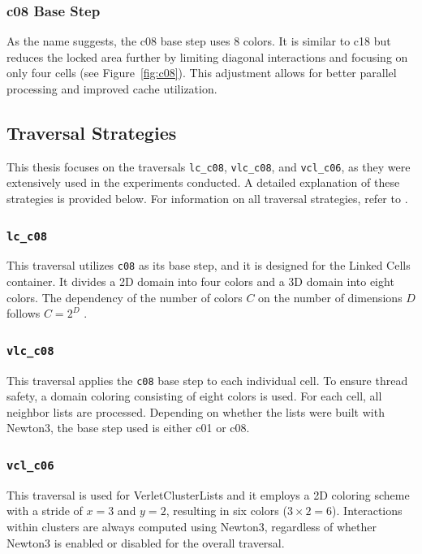 \subsubsection{c08 Base Step} As the name suggests, the c08 base step uses 8 colors. It is similar to c18 but reduces the locked area further by limiting diagonal interactions and focusing on only four cells (see Figure~\ref{fig:c08}). This adjustment allows for better parallel processing and improved cache utilization.


\subsection{Traversal Strategies}
This thesis focuses on the traversals \texttt{lc\_c08}, \texttt{vlc\_c08}, and \texttt{vcl\_c06}, as they were extensively used in the experiments conducted. A detailed explanation of these strategies is provided below. For information on all traversal strategies, refer to \parencite{gratl2022n}.

\subsubsection{\texttt{lc\_c08}}
This traversal utilizes \texttt{c08} as its base step, and it is designed for the Linked Cells container. It divides a 2D domain into four colors and a 3D domain into eight colors. The dependency of the number of colors \(C\) on the number of dimensions \(D\) follows \(C = 2^D\) \parencite{gratl2022n}.

\subsubsection{\texttt{vlc\_c08}}
This traversal applies the \texttt{c08} base step to each individual cell. To ensure thread safety, a domain coloring consisting of eight colors is used. For each cell, all neighbor lists are processed. Depending on whether the lists were built with Newton3, the base step used is either c01 or c08. \parencite{AutoPasDocs}

\subsubsection{\texttt{vcl\_c06}}
This traversal is used for VerletClusterLists and it employs a 2D coloring scheme with a stride of \(x = 3\) and \(y = 2\), resulting in six colors (\(3 \times 2 = 6\)). Interactions within clusters are always computed using Newton3, regardless of whether Newton3 is enabled or disabled for the overall traversal. \parencite{AutoPasDocs}

